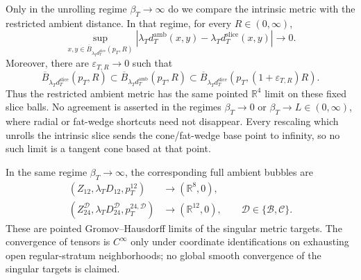 \begin{theorem}
Only in the unrolling regime \(\beta_T\to\infty\) do we compare the
intrinsic metric with the restricted ambient distance.  In that regime, for
every \(R\in(0,\infty)\),
\begin{equation}
 \sup_{x,y\in
  \overline B_{\lambda_Td_T^{\mathrm{slice}}}(p_T,R)}
 \left|
  \lambda_Td_T^{\mathrm{amb}}(x,y)
  -\lambda_Td_T^{\mathrm{slice}}(x,y)
 \right|\longrightarrow0.
 \label{sphere-metric-intrinsic-ambient-agreement}
\end{equation}
Moreover, there are \(\varepsilon_{T,R}\to0\) such that
\begin{equation}
 \overline B_{\lambda_Td_T^{\mathrm{slice}}}(p_T,R)
 \subset
 \overline B_{\lambda_Td_T^{\mathrm{amb}}}(p_T,R)
 \subset
 \overline B_{\lambda_Td_T^{\mathrm{slice}}}
             (p_T,(1+\varepsilon_{T,R})R).
 \label{sphere-metric-intrinsic-ambient-ball-comparison}
\end{equation}
Thus the restricted ambient metric has the same pointed
\(\mathbb R^4\) limit on these fixed slice balls.  No agreement is asserted
in the regimes \(\beta_T\to0\) or \(\beta_T\to L\in(0,\infty)\), where
radial or fat-wedge shortcuts need not disappear.  Every rescaling which
unrolls the intrinsic slice sends the cone/fat-wedge base point to infinity,
so no such limit is a tangent cone based at that point.

In the same regime \(\beta_T\to\infty\), the corresponding full ambient
bubbles are
\begin{align}
 (Z_{12},\lambda_TD_{12},p_T^{12})
 &\longrightarrow(\mathbb R^8,0),\\
 (Z_{24}^{\mathcal D},\lambda_TD_{24}^{\mathcal D},
  p_T^{24,\mathcal D})
 &\longrightarrow(\mathbb R^{12},0),
 \qquad\mathcal D\in\{\mathcal B,\mathcal C\}.
 \label{sphere-metric-arbitrary-unrolling-ambient-bubbles}
\end{align}
These are pointed Gromov--Hausdorff limits of the singular metric targets.
The convergence of tensors is \(C^\infty\) only under coordinate
identifications on exhausting open regular-stratum neighborhoods; no
global smooth convergence of the singular targets is claimed.
\end{theorem}

